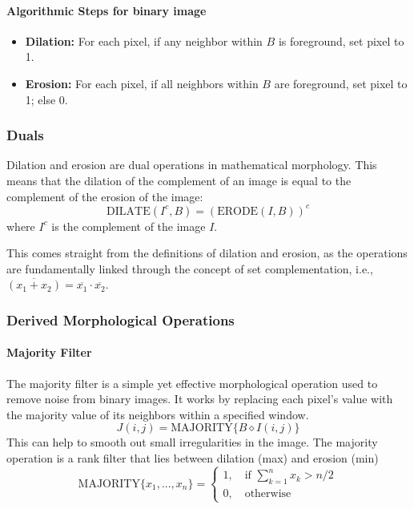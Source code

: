 
\paragraph{Algorithmic Steps for binary image}
\begin{itemize}
    \item \textbf{Dilation:} For each pixel, if any neighbor within $B$ is foreground, set pixel to 1.
    \item \textbf{Erosion:} For each pixel, if all neighbors within $B$ are foreground, set pixel to 1; else 0.
\end{itemize}


\subsubsection{Duals}
Dilation and erosion are dual operations in mathematical morphology. This means that the dilation of the complement of an image is equal to the complement of the erosion of the image:
$$
\text{DILATE}(I^c, B) = (\text{ERODE}(I, B))^c
$$
where $I^c$ is the complement of the image $I$.

This comes straight from the definitions of dilation and erosion, as the operations are fundamentally linked through the concept of set complementation, i.e., $\overline{(x_1 + x_2)} = \overline{x_1} \cdot \overline{x_2}$.

\subsubsection{Derived Morphological Operations}

\paragraph{Majority Filter}
The majority filter is a simple yet effective morphological operation used to remove noise from binary images. It works by replacing each pixel's value with the majority value of its neighbors within a specified window. 
\[
J(i,j) = \text{MAJORITY} \{ B \diamond I(i,j) \}
\]
This can help to smooth out small irregularities in the image. The majority operation is a rank filter that lies between dilation (max) and erosion (min)
\[
\text{MAJORITY}\{x_{1},...,x_{n}\} =
\begin{cases}
1,\quad \text{if } \sum_{k=1}^n x_k > n/2 \\
0,\quad \text{otherwise}
\end{cases}
\]

